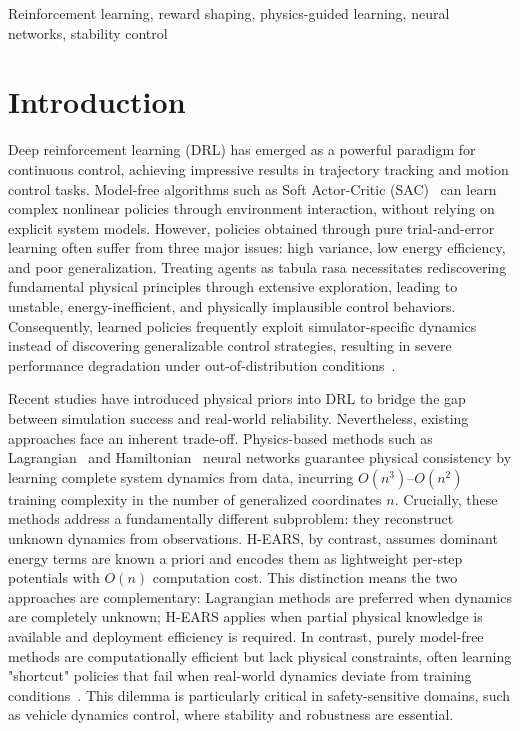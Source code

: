 \documentclass[journal]{IEEEtran}
\begin{document}
	\begin{IEEEkeywords}
		Reinforcement learning, reward shaping, physics-guided learning, neural networks, stability control
	\end{IEEEkeywords}
	
	\section{Introduction}
	
	Deep reinforcement learning (DRL) has emerged as a powerful paradigm for continuous control, achieving impressive results in trajectory tracking and motion control tasks. Model-free algorithms such as Soft Actor-Critic (SAC)~\cite{haarnoja2018soft} can learn complex nonlinear policies through environment interaction, without relying on explicit system models. However, policies obtained through pure trial-and-error learning often suffer from three major issues: high variance, low energy efficiency, and poor generalization. Treating agents as tabula rasa necessitates rediscovering fundamental physical principles through extensive exploration, leading to unstable, energy-inefficient, and physically implausible control behaviors. Consequently, learned policies frequently exploit simulator-specific dynamics instead of discovering generalizable control strategies, resulting in severe performance degradation under out-of-distribution conditions~\cite{cobbe2019quantifying}.
	
	Recent studies have introduced physical priors into DRL to bridge the gap between simulation success and real-world reliability. Nevertheless, existing approaches face an inherent trade-off. Physics-based methods such as Lagrangian~\cite{lutter2019deep} and Hamiltonian~\cite{greydanus2019hamiltonian} neural networks guarantee physical consistency by learning complete system dynamics from data, incurring $O(n^3)$--$O(n^2)$ training complexity in the number of generalized coordinates $n$. Crucially, these methods address a fundamentally different subproblem: they reconstruct unknown dynamics from observations. H-EARS, by contrast, assumes dominant energy terms are known a priori and encodes them as lightweight per-step potentials with $O(n)$ computation cost. This distinction means the two approaches are complementary: Lagrangian methods are preferred when dynamics are completely unknown; H-EARS applies when partial physical knowledge is available and deployment efficiency is required. In contrast, purely model-free methods are computationally efficient but lack physical constraints, often learning "shortcut" policies that fail when real-world dynamics deviate from training conditions~\cite{zhang2021learning}. This dilemma is particularly critical in safety-sensitive domains, such as vehicle dynamics control, where stability and robustness are essential.
	
\end{document}
